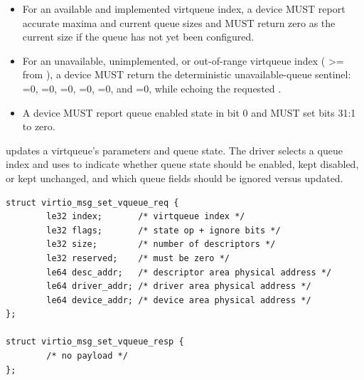 \begin{itemize}
  \item For an available and implemented virtqueue index, a device MUST report
        accurate maxima and current queue sizes and MUST return zero as the
        current size if the queue has not yet been configured.
  \item For an unavailable, unimplemented, or out-of-range virtqueue index
        ( >=  from ),
        a device MUST return the deterministic unavailable-queue sentinel:
        =0, =0, =0,
        =0, =0, and =0,
        while echoing the requested .
  \item A device MUST report queue enabled state in  bit 0 and
        MUST set  bits 31:1 to zero.
\end{itemize}


 updates a virtqueue's parameters and queue state. The
driver selects a queue index and uses  to indicate whether queue
state should be enabled, kept disabled, or kept unchanged, and which queue
fields should be ignored versus updated.

\begin{lstlisting}
struct virtio_msg_set_vqueue_req {
        le32 index;       /* virtqueue index */
        le32 flags;       /* state op + ignore bits */
        le32 size;        /* number of descriptors */
        le32 reserved;    /* must be zero */
        le64 desc_addr;   /* descriptor area physical address */
        le64 driver_addr; /* driver area physical address */
        le64 device_addr; /* device area physical address */
};

struct virtio_msg_set_vqueue_resp {
        /* no payload */
};
\end{lstlisting}

